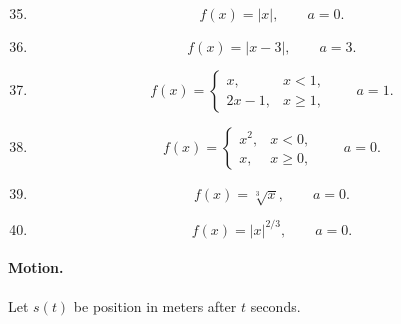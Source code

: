 \begin{enumerate}
\setcounter{enumi}{34}

\item
\[
f(x)=|x|,\qquad a=0.
\]

\item
\[
f(x)=|x-3|,\qquad a=3.
\]

\item
\[
f(x)=
\begin{cases}
x, & x<1,\\
2x-1, & x\ge1,
\end{cases}
\qquad a=1.
\]

\item
\[
f(x)=
\begin{cases}
x^2, & x<0,\\
x, & x\ge0,
\end{cases}
\qquad a=0.
\]

\item
\[
f(x)=\sqrt[3]{x},\qquad a=0.
\]

\item
\[
f(x)=|x|^{2/3},\qquad a=0.
\]
\end{enumerate}

\paragraph{Motion.}
Let \(s(t)\) be position in meters after \(t\) seconds.

